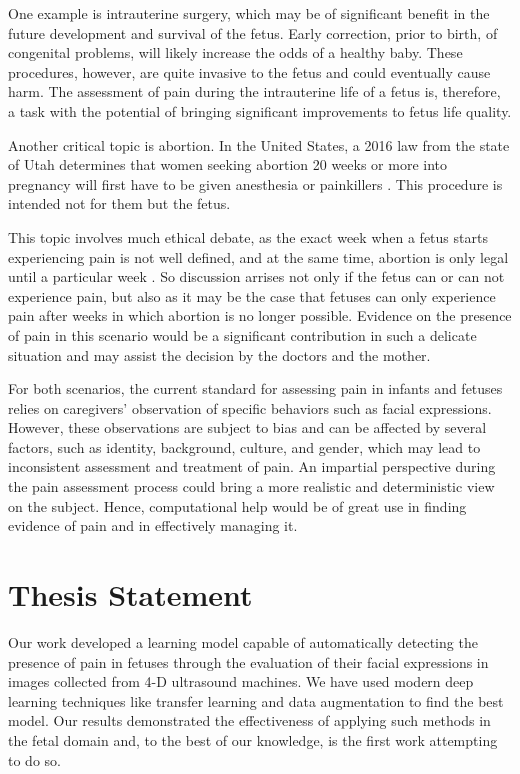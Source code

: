 One example is intrauterine surgery, which may be of significant benefit in the future development and survival of the fetus. Early correction, prior to birth, of congenital problems, will likely increase the odds of a healthy baby. These procedures, however, are quite invasive to the fetus and could eventually cause harm. The assessment of pain during the intrauterine life of a fetus is, therefore, a task with the potential of bringing significant improvements to fetus life quality. 

Another critical topic is abortion. In the United States, a 2016 law from the state of Utah determines that women seeking abortion 20 weeks or more into pregnancy will first have to be given anesthesia or painkillers \citep{healy2016nytimes}. This procedure is intended not for them but the fetus. 

This topic involves much ethical debate, as the exact week when a fetus starts experiencing pain is not well defined, and at the same time, abortion is only legal until a particular week \citep{Derbyshire2006}. So discussion arrises not only if the fetus can or can not experience pain, but also as it may be the case that fetuses can only experience pain after weeks in which abortion is no longer possible. Evidence on the presence of pain in this scenario would be a significant contribution in such a delicate situation and may assist the decision by the doctors and the mother.

For both scenarios, the current standard for assessing pain in infants and fetuses relies on caregivers' observation of specific behaviors such as facial expressions. However, these observations are subject to bias and can be affected by several factors, such as identity, background, culture, and gender, which may lead to inconsistent assessment and treatment of pain. An impartial perspective during the pain assessment process could bring a more realistic and deterministic view on the subject. Hence, computational help would be of great use in finding evidence of pain and in effectively managing it.

\section{Thesis Statement}

Our work developed a learning model capable of automatically detecting the presence of pain in fetuses through the evaluation of their facial expressions in images collected from 4-D ultrasound machines. We have used modern deep learning techniques like transfer learning and data augmentation to find the best model. Our results demonstrated the effectiveness of applying such methods in the fetal domain and, to the best of our knowledge, is the first work attempting to do so.


